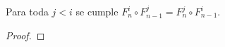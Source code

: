 \begin{ejercicio}\label{ej:61}
  Para toda $j<i$ se cumple $F^i_n\circ F^j_{n-1}=F^j_n\circ F^i_{n-1}$.
\end{ejercicio}
\begin{proof}%

\end{proof}%

